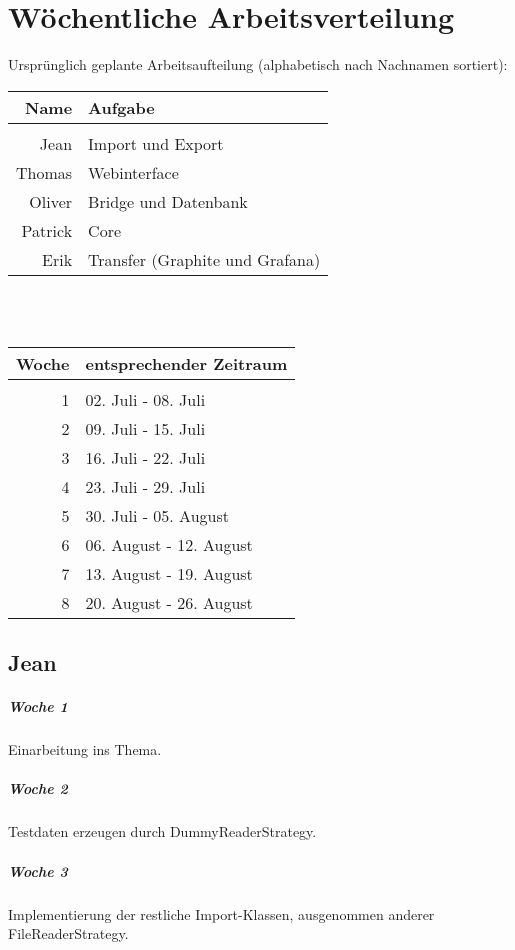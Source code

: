 \chapter{Wöchentliche Arbeitsverteilung}
Ursprünglich geplante Arbeitsaufteilung (alphabetisch nach Nachnamen sortiert):\\
\newline
\begin{tabular}{r|l}
	\textbf{Name} & \textbf{Aufgabe}\\
	\hline & \\[-1.0em]
	Jean & Import und Export\\[0.25em]
	Thomas & Webinterface\\[0.25em]
	Oliver & Bridge und Datenbank\\[0.25em]
	Patrick & Core\\[0.25em]
	Erik & Transfer (Graphite und Grafana)
\end{tabular}
\newline\\\\
\begin{tabular}{r|l}
	\textbf{Woche} & \textbf{entsprechender Zeitraum}\\
	\hline & \\[-1.0em]
	1 & 02. Juli - 08. Juli\\[0.25em]
	2 & 09. Juli - 15. Juli\\[0.25em]
	3 & 16. Juli - 22. Juli\\[0.25em]
	4 & 23. Juli - 29. Juli\\[0.25em]
	5 & 30. Juli - 05. August\\[0.25em]
	6 & 06. August - 12. August\\[0.25em]
	7 & 13. August - 19. August\\[0.25em]
	8 & 20. August - 26. August
\end{tabular}
\newpage
\section{Jean}
\paragraph{Woche 1}
Einarbeitung ins Thema.
\paragraph{Woche 2}
Testdaten erzeugen durch DummyReaderStrategy.
\paragraph{Woche 3}
Implementierung der restliche Import-Klassen, ausgenommen anderer FileReaderStrategy.
